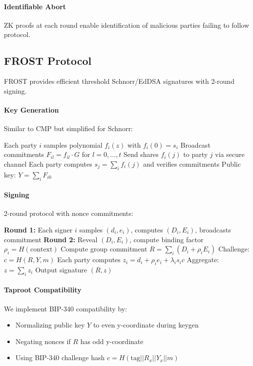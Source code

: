 \paragraph{Identifiable Abort} ZK proofs at each round enable identification of malicious parties failing to follow protocol.

\subsection{FROST Protocol}

FROST \cite{komlo2020} provides efficient threshold Schnorr/EdDSA signatures with 2-round signing.

\paragraph{Key Generation} Similar to CMP but simplified for Schnorr:
\begin{algorithmic}[1]
\State Each party $i$ samples polynomial $f_i(z)$ with $f_i(0) = s_i$
\State Broadcast commitments $F_{il} = f_{il} \cdot G$ for $l = 0, \ldots, t$
\State Send shares $f_i(j)$ to party $j$ via secure channel
\State Each party computes $s_j = \sum_i f_i(j)$ and verifies commitments
\State Public key: $Y = \sum_i F_{i0}$
\end{algorithmic}

\paragraph{Signing} 2-round protocol with nonce commitments:
\begin{algorithmic}[1]
\State \textbf{Round 1:} Each signer $i$ samples $(d_i, e_i)$, computes $(D_i, E_i)$, broadcasts commitment
\State \textbf{Round 2:} Reveal $(D_i, E_i)$, compute binding factor $\rho_i = H(\text{context})$
\State Compute group commitment $R = \sum_i (D_i + \rho_i E_i)$
\State Challenge: $c = H(R, Y, m)$
\State Each party computes $z_i = d_i + \rho_i e_i + \lambda_i s_i c$
\State Aggregate: $z = \sum_i z_i$
\State Output signature $(R, z)$
\end{algorithmic}

\paragraph{Taproot Compatibility} We implement BIP-340 \cite{bip340} compatibility by:
\begin{itemize}
\item Normalizing public key $Y$ to even y-coordinate during keygen
\item Negating nonces if $R$ has odd y-coordinate
\item Using BIP-340 challenge hash $c = H(\text{tag} || R_x || Y_x || m)$
\end{itemize}

